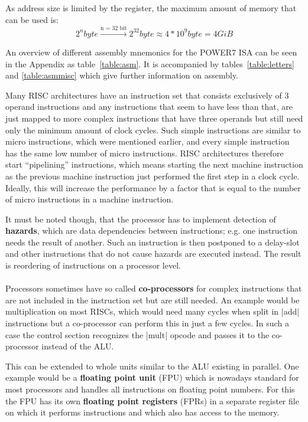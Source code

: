 As address size is limited by the register, the maximum amount of memory that can be used is:
\begin{equation}
    2^{n} byte \xrightarrow{\text{n = 32 bit}} 2^{32} byte \approx 4*10^{9} byte = 4 GiB
\end{equation}

An overview of different assembly mnemonics for the POWER7 ISA can be seen in the Appendix as table~\ref{table:asm}.
It is accompanied by tables~\ref{table:letters} and \ref{table:asmmisc} which give further information on assembly.

Many RISC architectures have an instruction set that consists exclusively of 3 operand instructions and any instructions that seem to have less than that, are just mapped to more complex instructions that have three operands but still need only the minimum amount of clock cycles.
Such simple instructions are similar to micro instructions, which were mentioned earlier, and every simple instruction has the same low number of micro instructions.
RISC architectures therefore start ``pipelining'' instructions, which means starting the next machine instruction as the previous machine instruction just performed the first step in a clock cycle.
Ideally, this will increase the performance by a factor that is equal to the number of micro instructions in a machine instruction.

It must be noted though, that the processor has to implement detection of \textbf{hazards}, which are data dependencies between instructions; e.g. one instruction needs the result of another.
Such an instruction is then postponed to a delay-slot and other instructions that do not cause hazards are executed instead.
The result is reordering of instructions on a processor level.
\\
\\
Processors sometimes have so called \textbf{co-processors} for complex instructions that are not included in the instruction set but are still needed.
An example would be multiplication on most RISCs, which would need many cycles when split in |add| instructions but a co-processor can perform this in just a few cycles.
In such a case the control section recognizes the |mult| opcode and passes it to the co-processor instead of the ALU.

This can be extended to whole units similar to the ALU existing in parallel.
One example would be a \textbf{floating point unit} (FPU) which is nowadays standard for most processors and handles all instructions on floating point numbers.
For this the FPU has its own \textbf{floating point registers} (FPRs) in a separate register file on which it performs instructions and which also has access to the memory.

